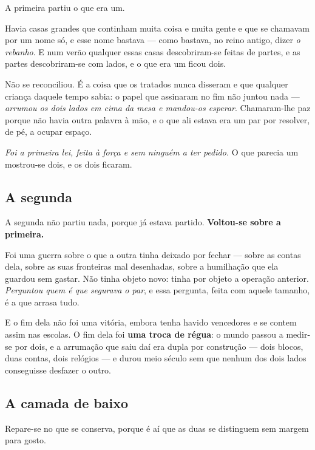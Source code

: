 \documentclass[livro.tex]{subfiles}
\begin{document}
A primeira partiu o que era um.

\medskip

Havia casas grandes que continham muita coisa e muita gente e que se chamavam por um nome só, e
esse nome bastava --- como bastava, no reino antigo, dizer \emph{o rebanho}. E num verão qualquer
essas casas descobriram-se feitas de partes, e as partes descobriram-se com lados, e o que era um
ficou dois.

\medskip

Não se reconciliou. É a coisa que os tratados nunca disseram e que qualquer criança daquele tempo
sabia: o papel que assinaram no fim não juntou nada --- \emph{arrumou os dois lados em cima da
mesa e mandou-os esperar}. Chamaram-lhe paz porque não havia outra palavra à mão, e o que ali
estava era um par por resolver, de pé, a ocupar espaço.

\medskip

\emph{Foi a primeira lei, feita à força e sem ninguém a ter pedido.} O que parecia um mostrou-se
dois, e os dois ficaram.

\subsection*{A segunda}

A segunda não partiu nada, porque já estava partido. \textbf{Voltou-se sobre a primeira.}

\medskip

Foi uma guerra sobre o que a outra tinha deixado por fechar --- sobre as contas dela, sobre as
suas fronteiras mal desenhadas, sobre a humilhação que ela guardou sem gastar. Não tinha objeto
novo: tinha por objeto a operação anterior. \emph{Perguntou quem é que segurava o par}, e essa
pergunta, feita com aquele tamanho, é a que arrasa tudo.

\medskip

E o fim dela não foi uma vitória, embora tenha havido vencedores e se contem assim nas escolas. O
fim dela foi \textbf{uma troca de régua}: o mundo passou a medir-se por dois, e a arrumação que
saiu daí era dupla por construção --- dois blocos, duas contas, dois relógios --- e durou meio
século sem que nenhum dos dois lados conseguisse desfazer o outro.

\subsection*{A camada de baixo}

Repare-se no que se conserva, porque é aí que as duas se distinguem sem margem para gosto.
\end{document}
